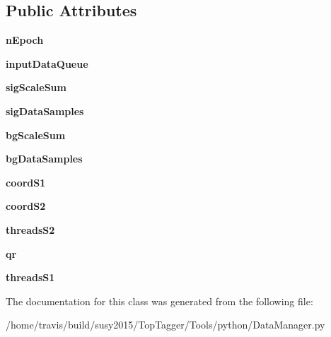 \subsection*{Public Attributes}
\begin{DoxyCompactItemize}
\item 
\hypertarget{classDataManager_1_1DataManager_a601a92a29ce1628428bfac190af9c5cf}{{\bfseries n\-Epoch}}\label{classDataManager_1_1DataManager_a601a92a29ce1628428bfac190af9c5cf}

\item 
\hypertarget{classDataManager_1_1DataManager_ac7399c255de1bf5d153359e031742ddf}{{\bfseries input\-Data\-Queue}}\label{classDataManager_1_1DataManager_ac7399c255de1bf5d153359e031742ddf}

\item 
\hypertarget{classDataManager_1_1DataManager_a3ae70618c6582c9ed2c8d7f9f7eea5c6}{{\bfseries sig\-Scale\-Sum}}\label{classDataManager_1_1DataManager_a3ae70618c6582c9ed2c8d7f9f7eea5c6}

\item 
\hypertarget{classDataManager_1_1DataManager_aa384d054b72b38547f1784921dd28d2f}{{\bfseries sig\-Data\-Samples}}\label{classDataManager_1_1DataManager_aa384d054b72b38547f1784921dd28d2f}

\item 
\hypertarget{classDataManager_1_1DataManager_a0a1506a6aa38f28efc2a423fb1e4d82c}{{\bfseries bg\-Scale\-Sum}}\label{classDataManager_1_1DataManager_a0a1506a6aa38f28efc2a423fb1e4d82c}

\item 
\hypertarget{classDataManager_1_1DataManager_afaac724759cf44f46d0ed4214384f549}{{\bfseries bg\-Data\-Samples}}\label{classDataManager_1_1DataManager_afaac724759cf44f46d0ed4214384f549}

\item 
\hypertarget{classDataManager_1_1DataManager_a3286c308c0ff5f86f91126838273088f}{{\bfseries coord\-S1}}\label{classDataManager_1_1DataManager_a3286c308c0ff5f86f91126838273088f}

\item 
\hypertarget{classDataManager_1_1DataManager_a33d474a8010c2235c48cd10407b0f9e2}{{\bfseries coord\-S2}}\label{classDataManager_1_1DataManager_a33d474a8010c2235c48cd10407b0f9e2}

\item 
\hypertarget{classDataManager_1_1DataManager_a0da4da348d64b2764ec2a79e3d6e0c50}{{\bfseries threads\-S2}}\label{classDataManager_1_1DataManager_a0da4da348d64b2764ec2a79e3d6e0c50}

\item 
\hypertarget{classDataManager_1_1DataManager_af320ecb779efb8f5d91a13893f5c23b7}{{\bfseries qr}}\label{classDataManager_1_1DataManager_af320ecb779efb8f5d91a13893f5c23b7}

\item 
\hypertarget{classDataManager_1_1DataManager_acb651b61c2cc6cc2cae36eda745cc2c4}{{\bfseries threads\-S1}}\label{classDataManager_1_1DataManager_acb651b61c2cc6cc2cae36eda745cc2c4}

\end{DoxyCompactItemize}


The documentation for this class was generated from the following file\-:\begin{DoxyCompactItemize}
\item 
/home/travis/build/susy2015/\-Top\-Tagger/\-Tools/python/Data\-Manager.\-py\end{DoxyCompactItemize}
